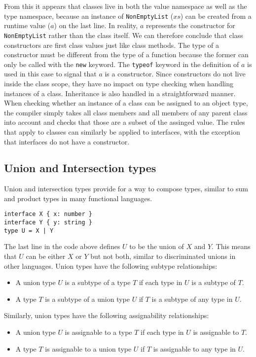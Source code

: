 From this it appears that classes live in both the value namespace as well as the type namespace,
because an instance of \texttt{NonEmptyList} ($xs$) can be created from a runtime value ($a$) on the last line.
In reality, $a$ represents the constructor for \texttt{NonEmptyList} rather than the class itself.
We can therefore conclude that class constructors are first class values just like class methods.
The type of a constructor must be different from the type of a function because the former can only be called with the \texttt{new} keyword.
The \texttt{typeof} keyword in the definition of $a$ is used in this case to signal that $a$ is a constructor.
Since constructors do not live inside the class scope, they have no impact on type checking when handling instances of a class.
\bigskip
Inheritance is also handled in a straightforward manner.
When checking whether an instance of a class can be assigned to an object type, the compiler
simply takes all class members and all members of any parent class into account and checks that those are a subset of the assinged value.
The rules that apply to classes can similarly be applied to interfaces, with the exception that interfaces do not have a constructor.

\subsection{Union and Intersection types}
Union and intersection types provide for a way to compose types, similar to sum and product types in many functional languages.
\begin{lstlisting}
interface X { x: number }
interface Y { y: string }
type U = X | Y
\end{lstlisting}

The last line in the code above defines $U$ to be the union of $X$ and $Y$. 
This means that $U$ can be either $X$ or $Y$ but not both, similar to discriminated unions in other languages.
Union types have the following subtype relationships:
\begin{itemize}
\item A union type $U$ is a subtype of a type $T$ if each type in $U$ is a subtype of $T$.
\item A type $T$ is a subtype of a union type $U$ if $T$ is a subtype of any type in $U$.
\end{itemize}
Similarly, union types have the following assignability relationships:
\begin{itemize}
\item A union type $U$ is assignable to a type $T$ if each type in $U$ is assignable to $T$.
\item A type $T$ is assignable to a union type $U$ if $T$ is assignable to any type in $U$.
\end{itemize}

